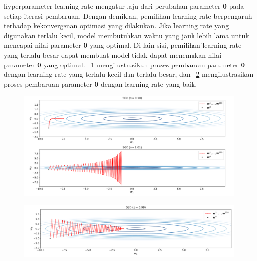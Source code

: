    \f{hyperparameter} \f{learning rate} mengatur laju dari perubahan parameter $\bm{\theta}$ pada setiap iterasi pembaruan. Dengan demikian, pemilihan \f{learning rate} berpengaruh terhadap kekonvergenan optimasi yang dilakukan. Jika \f{learning rate} yang digunakan terlalu kecil, model membutuhkan waktu yang jauh lebih lama untuk mencapai nilai parameter $\bm{\theta}$ yang optimal. Di lain sisi, pemilihan \f{learning rate} yang terlalu besar dapat membuat model tidak dapat menemukan nilai parameter $\bm{\theta}$ yang optimal. \pic~\ref{fig:learning-rate-bad} mengilustrasikan proses pembaruan parameter $\bm{\theta}$ dengan \f{learning rate} yang terlalu kecil dan terlalu besar, dan \pic~\ref{fig:learning-rate-good} mengilustrasikan proses pembaruan parameter $\bm{\theta}$ dengan \f{learning rate} yang baik.
\begin{figure}
    \centering
    \includegraphics[width=1\textwidth]{assets/pics/learning-rate-bad.png}
    \label{fig:learning-rate-bad}
\end{figure}

\begin{figure}
    \centering
    \includegraphics[width=1\textwidth]{assets/pics/learning-rate-good.png}
    \label{fig:learning-rate-good}
\end{figure}

